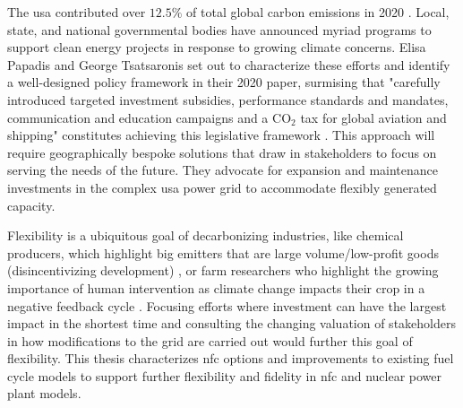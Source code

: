 The \gls{usa} contributed over $12.5\%$ of total global carbon emissions in 2020 \cite{european_commission_joint_research_centre_ghg_2021}. Local, state, and national governmental bodies have announced myriad programs to support clean energy projects in response to growing climate concerns. Elisa Papadis and George Tsatsaronis set out to characterize these efforts and identify a well-designed policy framework in their 2020 paper, surmising that "carefully introduced targeted investment subsidies, performance standards and mandates, communication and education campaigns and a CO$_2$ tax for global aviation and shipping" constitutes achieving this legislative framework \cite{papadis_challenges_2020}. This approach will require geographically bespoke solutions that draw in stakeholders to focus on serving the needs of the future. They advocate for expansion and maintenance investments in the complex \gls{usa} power grid to accommodate flexibly generated capacity.


Flexibility is a ubiquitous goal of decarbonizing industries, like chemical producers, which highlight big emitters that are large volume/low-profit goods (disincentivizing development) \cite{mallapragada_decarbonization_2023}, or farm researchers who highlight the growing importance of human intervention as climate change impacts their crop in a negative feedback cycle \cite{farokhi_soofi_farm_2022}. Focusing efforts where investment can have the largest impact in the shortest time and consulting the changing valuation of stakeholders in how modifications to the grid are carried out would further this goal of flexibility. This thesis characterizes \gls{nfc} options and improvements to existing fuel cycle models to support further flexibility and fidelity in \gls{nfc} and nuclear power plant models.



